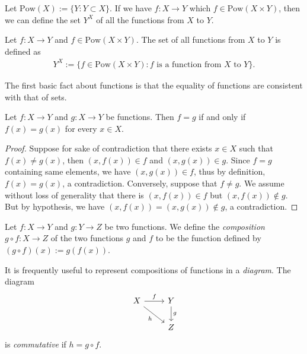 Let $\mathrm{Pow}(X) := \{Y : Y \subset X\}$. If we have $f : X \to Y$ which $f \in \mathrm{Pow}(X \times Y)$, then we can define the set $Y^X$ of all the functions from $X$ to $Y$.

\begin{definition}
    Let $f : X \to Y$ and $f \in \mathrm{Pow}(X \times Y)$. The set of all functions from $X$ to $Y$ is defined as
    \begin{align*}
        Y^X := \{f \in \mathrm{Pow}(X \times Y) : f \text{ is a function from } X \text{ to } Y\}.
    \end{align*}
\end{definition}

The first basic fact about functions is that the equality of functions are consistent with that of sets.

\begin{lemma}
    Let $f : X \to Y$ and $g : X \to Y$ be functions. Then $f = g$ if and only if $f(x) = g(x)$ for every $x \in X$.
\end{lemma}

\begin{proof}
    Suppose for sake of contradiction that there exists $x \in X$ such that $f(x) \neq g(x)$, then $(x, f(x)) \in f$ and $(x, g(x)) \in g$. Since $f = g$ containing same elements, we have $(x, g(x)) \in f$, thus by definition, $f(x) = g(x)$, a contradiction. Conversely, suppose that $f \neq g$. We assume without loss of generality that there is $(x, f(x)) \in f$ but $(x, f(x)) \notin g$. But by hypothesis, we have $(x, f(x)) = (x, g(x)) \notin g$, a contradiction.
\end{proof}

\begin{definition}[Composition]
    Let $f : X \to Y$ and $g : Y \to Z$ be two functions. We define the \emph{composition} $g \circ f : X \to Z$ of the two functions $g$ and $f$ to be the function defined by $(g \circ f)(x) := g(f(x))$.
\end{definition}

\begin{remark}
    It is frequently useful to represent compositions of functions in a \emph{diagram}. The diagram
    \[
    \begin{tikzcd}
        X \arrow[r, "f"] \arrow[dr, swap, "h"] & Y \arrow[d, "g"]\\
        & Z
    \end{tikzcd}
    \]
    is \emph{commutative} if $h = g \circ f$.
\end{remark}

